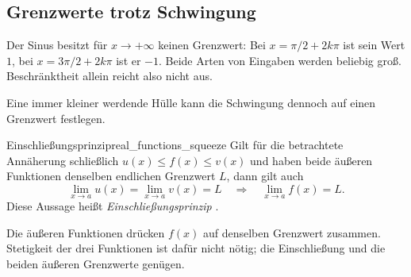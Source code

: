 \clearpage
\subsection{Grenzwerte trotz Schwingung}
\label{subsec:real_functions_squeeze}
Der Sinus besitzt für $x\to+\infty$ keinen Grenzwert:
Bei $x=\pi/2+2k\pi$ ist sein Wert $1$, bei $x=3\pi/2+2k\pi$ ist er $-1$.
Beide Arten von Eingaben werden beliebig groß. Beschränktheit allein
reicht also nicht aus.

Eine immer kleiner werdende Hülle kann die Schwingung dennoch
auf einen Grenzwert festlegen.
\begin{TheoremBox}{Einschließungsprinzip}{real_functions_squeeze}
  Gilt für die betrachtete Annäherung schließlich
  $u(x)\le f(x)\le v(x)$ und haben beide äußeren Funktionen denselben
  endlichen Grenzwert $L$, dann gilt auch
  \[
    \lim_{x\to a}u(x)=\lim_{x\to a}v(x)=L
    \quad\Longrightarrow\quad
    \lim_{x\to a}f(x)=L.
  \]
  Diese Aussage heißt \emph{Einschließungsprinzip}
  .
\end{TheoremBox}
\begin{center}
\end{center}
Die äußeren Funktionen drücken $f(x)$ auf denselben Grenzwert zusammen.
Stetigkeit der drei Funktionen ist dafür nicht nötig; die Einschließung
und die beiden äußeren Grenzwerte genügen.

